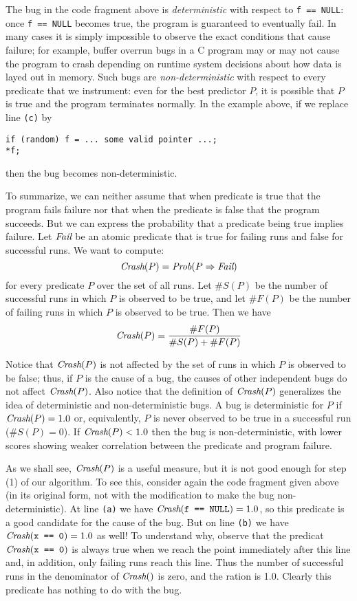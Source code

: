 The bug in the code fragment above is {\em deterministic} with respect
to {\tt f == NULL}: once {\tt f == NULL} becomes true, the program is guaranteed to eventually
fail.  In many cases it is simply impossible to observe the exact
conditions that cause failure; for example, buffer overrun bugs in a C
program may or may not cause the program to crash depending on runtime
system decisions about how data is layed out in memory.  Such bugs are
{\em non-deterministic} with respect to every predicate that we instrument:
even for the best predictor $P$, it is possible that $P$ is true and
the program terminates normally.  In the example above, if we replace line
{\tt (c)} by
\begin{verbatim}
if (random) f = ... some valid pointer ...;
*f;
\end{verbatim}
then the bug becomes non-deterministic.

To summarize, we can neither assume that when predicate is true that
the program fails failure nor that when the predicate is false that
the program succeeds. But we can express the probability that a predicate
being true implies failure.  Let $\mbox{\em Fail}$ be an atomic predicate that is
true for failing runs and false for successful runs.  We want to compute:
\[ \mbox{\em Crash}(P) = \mbox{\em Prob}(P \Rightarrow \mbox{\em Fail}) \]
for every predicate $P$ over the set of all runs.  Let $\#S(P)$ be the number
of successful runs in which $P$ is observed to be true, and let $\#F(P)$ be the number of
failing runs in which $P$ is observed to be true.  Then we have
\[ \mbox{\em Crash}(P) = \frac{\#F(P)}{\#S(P) + \#F(P)} \]

Notice that $\mbox{\em Crash}(P)$ is not affected by the set of runs in which
$P$ is observed to be false; thus, if $P$ is the cause of a bug, the
causes of other independent bugs do not affect $\mbox{\em Crash}(P)$.  Also
notice that the definition of $\mbox{\em Crash}(P)$ generalizes the idea of
deterministic and non-deterministic bugs.  A bug is deterministic for
$P$ if $\mbox{\em Crash}(P) = 1.0$ or, equivalently, $P$ is never observed to be
true in a successful run ($\#S(P) = 0$). If $\mbox{\em Crash}(P) < 1.0$ then the
bug is non-deterministic, with lower scores showing weaker correlation
between the predicate and program failure.

As we shall see, $\mbox{\em Crash}(P)$ is a useful measure, but it is not good
enough for step (1) of our algorithm. To see this, consider again the
code fragment given above (in its original form, not with the
modification to make the bug non-deterministic).  At line {\tt (a)} we
have $\mbox{\em Crash}(\mbox{\tt f == NULL}) = 1.0$, so this predicate is a good
candidate for the cause of the bug.  
But on line {\tt (b)} we have $\mbox{\em Crash}(\mbox{\tt x == 0}) = 1.0$ as well!
To understand why, observe that the predicat $\mbox{\em Crash}(\mbox{\tt x == 0})$ is always
true when we reach the point immediately after this line and, in addition, only failing runs reach this line.
Thus the number of successful runs in the denominator of $\mbox{\em Crash}()$ is zero,
and the ration is 1.0. Clearly this predicate has nothing to do with the bug.

